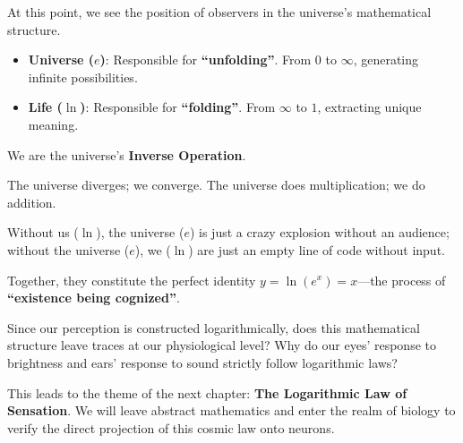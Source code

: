 At this point, we see the position of observers in the universe's mathematical structure.

\begin{itemize}
\item \textbf{Universe ($e$)}: Responsible for \textbf{``unfolding''}. From $0$ to $\infty$, generating infinite possibilities.

\item \textbf{Life ($\ln$)}: Responsible for \textbf{``folding''}. From $\infty$ to $1$, extracting unique meaning.
\end{itemize}

We are the universe's \textbf{Inverse Operation}.

The universe diverges; we converge. The universe does multiplication; we do addition.

Without us ($\ln$), the universe ($e$) is just a crazy explosion without an audience; without the universe ($e$), we ($\ln$) are just an empty line of code without input.

Together, they constitute the perfect identity $y = \ln(e^x) = x$---the process of \textbf{``existence being cognized''}.

Since our perception is constructed logarithmically, does this mathematical structure leave traces at our physiological level? Why do our eyes' response to brightness and ears' response to sound strictly follow logarithmic laws?

This leads to the theme of the next chapter: \textbf{The Logarithmic Law of Sensation}. We will leave abstract mathematics and enter the realm of biology to verify the direct projection of this cosmic law onto neurons.

